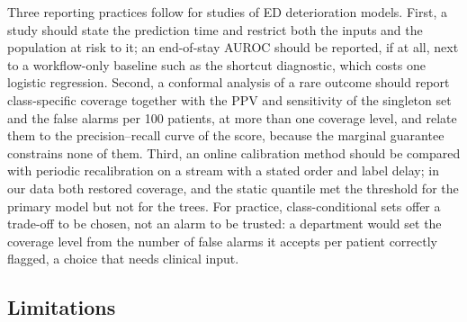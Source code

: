 Three reporting practices follow for studies of ED deterioration models. First, a study should state the prediction time and restrict both the inputs and the
population at risk to it; an end-of-stay AUROC should be reported, if at all, next to a workflow-only baseline such as the shortcut diagnostic, which costs one logistic
regression. Second, a conformal analysis of a rare outcome should report class-specific coverage together with the PPV and sensitivity of the singleton set and the
false alarms per 100 patients, at more than one coverage level, and relate them to the precision--recall curve of the score, because the marginal guarantee constrains none of them. Third, an online calibration method should be
compared with periodic recalibration on a stream with a stated order and label delay; in our data both restored coverage, and the static quantile met the threshold for the primary model but not for the trees. For practice, class-conditional sets offer a trade-off to be chosen, not an alarm to be trusted: a department would set the coverage level from the number of
false alarms it accepts per patient correctly flagged, a choice that needs clinical input.

\subsection{Limitations}
\label{sec:limitations}

